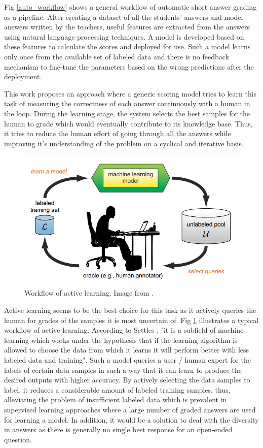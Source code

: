 Fig \ref{auto_workflow} shows a general workflow of automatic short answer grading as a pipeline. After creating a dataset of all the students' answers and model answers written by the teachers, useful features are extracted from the answers using natural language processing techniques. A model is developed based on these features to calculate the scores and deployed for use. Such a model learns only once from the available set of labeled data and there is no feedback mechanism to fine-tune the parameters based on the wrong predictions after the deployment.


This work proposes an approach where a generic scoring model tries to learn this task of measuring the correctness of each answer continuously with a human in the loop. During the learning stage, the system selects the best samples for the human to grade which would eventually contribute to its knowledge base. Thus, it tries to reduce the human effort of going through all the answers while improving it's understanding of the problem on a cyclical and iterative basis. \\

\begin{figure}[h!]
	\includegraphics[width=\textwidth]{images/active_learning}
	\caption{Workflow of active learning. Image from \cite{Settles2010}.}
	\label{ac_workflow}
\end{figure}

Active learning seems to be the best choice for this task as it actively queries the human for grades of the samples it is most uncertain of. Fig \ref{ac_workflow} illustrates a typical workflow of active learning. According to Settles \cite{Settles2010}, "it is a subfield of machine learning which works under the hypothesis that if the learning algorithm is allowed to choose the data from which it learns it will perform better with less labeled data and training". Such a model queries a user / human expert for the labels of certain data samples in such a way that it can learn to produce the desired outputs with higher accuracy. By actively selecting the data samples to label, it reduces a considerable amount of labeled training samples, thus, alleviating the problem of insufficient labeled data which is prevalent in supervised learning approaches where a large number of graded answers are used for learning a model. In addition, it would be a solution to deal with the diversity in answers as there is generally no single best response for an open-ended question.

